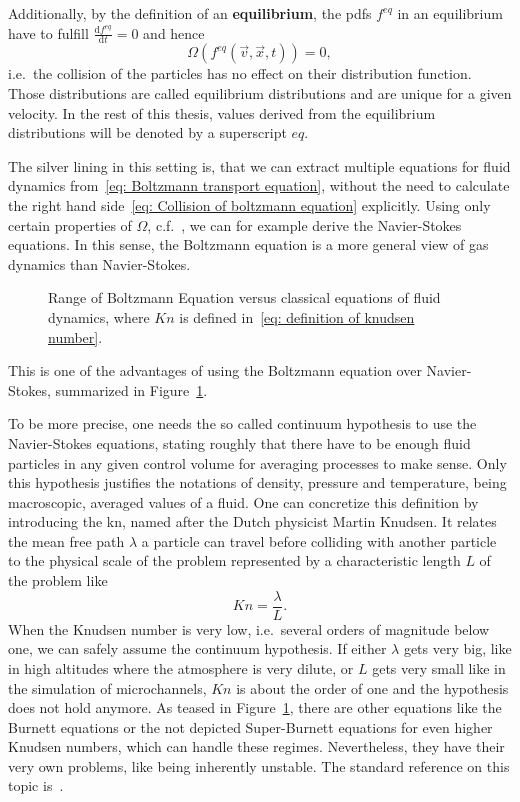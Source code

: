 Additionally, by the definition of an \textbf{equilibrium}, the \glspl{pdf} $f^{eq}$ in an equilibrium have to fulfill $\frac{\text{d}f^{eq}}{\text{d}t}=0$ and hence
\begin{equation*}
  \Omega(f^{eq}(\vec{v},\vec{x},t)) = 0,
\end{equation*}
i.e.\ the collision of the particles has no effect on their distribution function.
Those distributions are called equilibrium distributions and are unique for a given velocity.
In the rest of this thesis, values derived from the equilibrium distributions will be denoted by a superscript $eq$.

The silver lining in this setting is, that we can extract multiple equations for fluid dynamics from~\eqref{eq: Boltzmann transport equation}, without the need to calculate the right hand side~\eqref{eq: Collision of boltzmann equation} explicitly.
Using only certain properties of $\Omega$, c.f.~\cite[Pages 26 ff.]{harris2004introduction}, we can for example derive the Navier-Stokes equations.
In this sense, the Boltzmann equation is a more general view of gas dynamics than Navier-Stokes.
\begin{figure}
\centering

\caption{Range of Boltzmann Equation versus classical equations of fluid dynamics, where $Kn$ is defined in~\eqref{eq: definition of knudsen number}.}
\label{fig: boltzmann vs navier stokes}
\end{figure}

This is one of the advantages of using the Boltzmann equation over Navier-Stokes, summarized in Figure~\ref{fig: boltzmann vs navier stokes}.

To be more precise, one needs the so called continuum hypothesis to use the Navier-Stokes equations, stating roughly that there have to be enough fluid particles in any given control volume for averaging processes to make sense.
Only this hypothesis justifies the notations of density, pressure and temperature, being macroscopic, averaged values of a fluid.
One can concretize this definition by introducing the \gls{kn}, named after the Dutch physicist Martin Knudsen.
It relates the mean free path $\lambda$ a particle can travel before colliding with another particle to the physical scale of the problem represented by a characteristic length $L$ of the problem like
\begin{equation}
  \label{eq: definition of knudsen number}
  Kn=\frac{\lambda}{L}.
\end{equation}
When the Knudsen number is very low, i.e.\ several orders of magnitude below one, we can safely assume the continuum hypothesis.
If either $\lambda$ gets very big, like in high altitudes where the atmosphere is very dilute, or $L$ gets very small like in the simulation of microchannels, $Kn$ is about the order of one and the hypothesis does not hold anymore.
As teased in Figure~\ref{fig: boltzmann vs navier stokes}, there are other equations like the Burnett equations or the not depicted Super-Burnett equations for even higher Knudsen numbers, which can handle these regimes.
Nevertheless, they have their very own problems, like being inherently unstable.
The standard reference on this topic is~\cite{agarwal2001beyond}.
